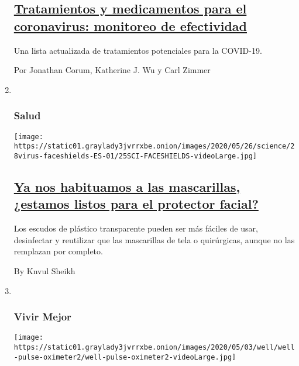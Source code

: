 \begin{enumerate}
  \hypertarget{tratamientos-y-medicamentos-para-el-coronavirus-monitoreo-de-efectividad}{%
  \subsection{\texorpdfstring{\href{/es/interactive/2020/science/coronavirus-tratamientos-curas.html}{Tratamientos
  y medicamentos para el coronavirus: monitoreo de
  efectividad}}{Tratamientos y medicamentos para el coronavirus: monitoreo de efectividad}}\label{tratamientos-y-medicamentos-para-el-coronavirus-monitoreo-de-efectividad}}

  Una lista actualizada de tratamientos potenciales para la COVID-19.

  Por Jonathan Corum, Katherine J. Wu y Carl Zimmer
\item ~
  \hypertarget{salud}{%
  \subsubsection{Salud}\label{salud}}

  \texttt{[image: https://static01.graylady3jvrrxbe.onion/images/2020/05/26/science/28virus-faceshields-ES-01/25SCI-FACESHIELDS-videoLarge.jpg]}

  \hypertarget{ya-nos-habituamos-a-las-mascarillas-estamos-listos-para-el-protector-facial}{%
  \subsection{\texorpdfstring{\href{/es/2020/05/28/espanol/caretas-protectoras-virus.html}{Ya
  nos habituamos a las mascarillas, ¿estamos listos para el protector
  facial?}}{Ya nos habituamos a las mascarillas, ¿estamos listos para el protector facial?}}\label{ya-nos-habituamos-a-las-mascarillas-estamos-listos-para-el-protector-facial}}

  Los escudos de plástico transparente pueden ser más fáciles de usar,
  desinfectar y reutilizar que las mascarillas de tela o quirúrgicas,
  aunque no las remplazan por completo.

  By Knvul Sheikh
\item ~
  \hypertarget{vivir-mejor}{%
  \subsubsection{Vivir Mejor}\label{vivir-mejor}}

  \texttt{[image: https://static01.graylady3jvrrxbe.onion/images/2020/05/03/well/well-pulse-oximeter2/well-pulse-oximeter2-videoLarge.jpg]}


\end{enumerate}
